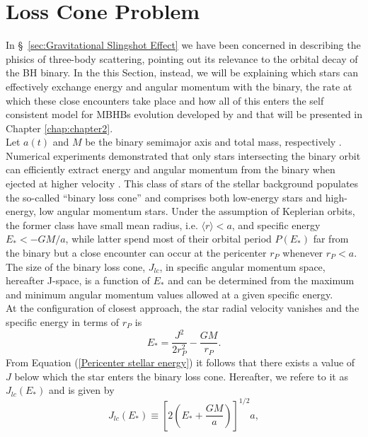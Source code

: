 \documentclass[12pt,twoside,openany]{book}
\begin{document}
\section{Loss Cone Problem}\label{sec:Loss Cone}
In \S~\ref{sec:Gravitational Slingshot Effect} we have been concerned in describing the phisics of three-body scattering, pointing out its relevance to the orbital decay of the BH binary. In the this Section, instead, we will be explaining which stars can effectively exchange energy and angular momentum with the binary, the rate at which these close encounters take place and how all of this enters the self consistent model for MBHBs evolution developed by \textcite{Quinlan_1996} and \textcite{Sesana_2010} that will be presented in Chapter \ref{chap:chapter2}.\\Let $a(t)$ and $M$ be the binary semimajor axis and total mass, respectively . Numerical experiments demonstrated that only stars intersecting the binary orbit can efficiently extract energy and angular momentum from the binary when ejected at higher velocity \parencite{Mikkola_1992}. This class of stars of the stellar background populates the so-called “binary loss cone” and comprises both low-energy stars and high-energy, low angular momentum stars. Under the assumption of Keplerian orbits, the former class have small mean radius, i.e. $\langle r\rangle<a$, and specific energy $E_*<-GM/a$, while latter spend most of their orbital period $P(E_*)$ far from the binary but a close encounter can occur at the pericenter $r_P$ whenever $r_P<a$.\\The size of the binary loss cone, $J_{lc}$, in specific angular momentum space, hereafter J-space, is a function of $E_*$ and can be determined from the maximum and minimum angular momentum values allowed at a given specific energy.\\At the configuration of closest approach, the star radial velocity vanishes and the specific energy in terms of $r_P$ is
\begin{equation}\label{Pericenter stellar energy}
 E_*=\frac{J^2}{2r_P^2}-\frac{GM}{r_P}.
\end{equation}
From Equation (\ref{Pericenter stellar energy}) it follows that there exists a value of $J$ below which the star enters the binary loss cone. Hereafter, we refere to it as $J_{lc}(E_*)$ and is given by
\begin{equation}\label{loss cone definition}
    J_{lc}(E_*)\equiv \left[2\left(E_*+\frac{GM}{a}\right)\right]^{1/2}a,
\end{equation}
\end{document}
